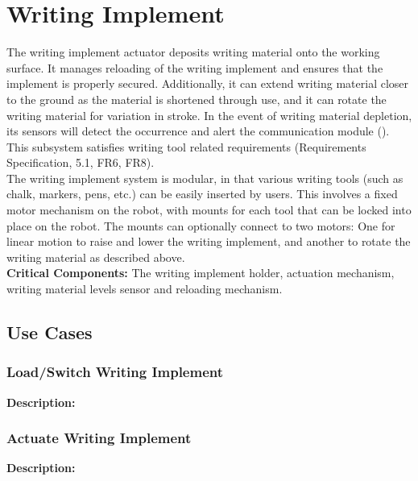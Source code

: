 
\section{Writing Implement}
\label{sec:writing_implement}
The writing implement actuator deposits writing material onto the working surface. It manages reloading of the writing implement and ensures that the implement is properly secured. Additionally, it can extend writing material closer to the ground as the material is shortened through use, and it can rotate the writing material for variation in stroke. In the event of writing material depletion, its sensors will detect the occurrence and alert the communication module (). This subsystem satisfies writing tool related requirements (Requirements Specification, 5.1, FR6, FR8). \\
The writing implement system is modular, in that various writing tools (such as chalk, markers, pens, etc.) can be easily inserted by users. This involves a fixed motor mechanism on the robot, with mounts for each tool that can be locked into place on the robot. The mounts can optionally connect to two motors: One for linear motion to raise and lower the writing implement, and another to rotate the writing material as described above. \\

\noindent
\textbf{Critical Components:} The writing implement holder, actuation mechanism, writing material levels sensor and reloading mechanism. 


\subsection{Use Cases}

\subsubsection{Load/Switch Writing Implement}
\textbf{Description:} 

\subsubsection{Actuate Writing Implement}
\textbf{Description:} 

